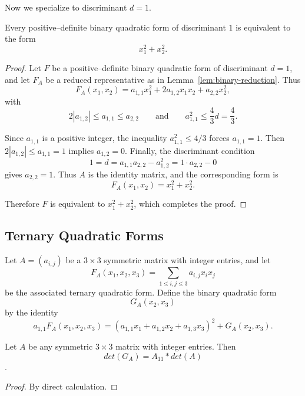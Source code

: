 Now we specialize to discriminant $d=1$.

\begin{theorem}
\label{thm:binary_quadMap_det_eq_one}
\leanok
Every positive–definite binary quadratic form of discriminant $1$
is equivalent to the form
\[
  x_1^2 + x_2^2.
\]
\end{theorem}

\begin{proof}
\leanok
Let $F$ be a positive–definite binary quadratic form of discriminant
$d=1$, and let $F_A$ be a reduced representative as in
Lemma~\ref{lem:binary-reduction}.
Thus
\[
  F_A(x_1,x_2)
  = a_{1,1}x_1^2 + 2a_{1,2}x_1x_2 + a_{2,2}x_2^2,
\]
with
\[
  2|a_{1,2}|\le a_{1,1}\le a_{2,2}
  \qquad\text{and}\qquad
  a_{1,1}^2 \le \frac{4}{3}d = \frac{4}{3}.
\]

Since $a_{1,1}$ is a positive integer, the inequality
$a_{1,1}^2 \le 4/3$ forces $a_{1,1}=1$.
Then $2|a_{1,2}|\le a_{1,1}=1$ implies $a_{1,2}=0$.
Finally, the discriminant condition
\[
  1 = d = a_{1,1}a_{2,2}-a_{1,2}^2 = 1\cdot a_{2,2}-0
\]
gives $a_{2,2}=1$.
Thus $A$ is the identity matrix, and the corresponding form is
\[
  F_A(x_1,x_2) = x_1^2 + x_2^2.
\]

Therefore $F$ is equivalent to $x_1^2 + x_2^2$, which completes the
proof.
\end{proof}

\subsection*{Ternary Quadratic Forms}

\begin{definition}
\label{def:QuadMap_Tenary_G}
\leanok
Let $A = (a_{i,j})$ be a $3\times 3$ symmetric matrix with integer entries, and
let
\[
F_A(x_1,x_2,x_3) = \sum_{1 \le i,j \le 3} a_{i,j} x_i x_j
\]
be the associated ternary quadratic form. Define the binary quadratic form
\[
G_A(x_2,x_3)
\]
by the identity
\begin{equation}\label{eq:1.3}
a_{1,1} F_A(x_1,x_2,x_3)
= (a_{1,1} x_1 + a_{1,2} x_2 + a_{1,3} x_3)^2 + G_A(x_2,x_3).
\end{equation}
\end{definition}

\begin{lemma}
\label{lem:QuadMap_Tenary_G_det}
\leanok 
Let $A$ be any symmetric $3\times 3$ matrix with integer entries. Then
\[det(G_A) = A_{11} * det(A)\].
\end{lemma} 
\begin{proof}
\leanok
By direct calculation.
\end{proof}

